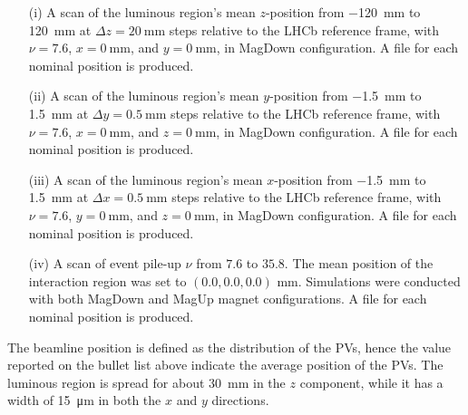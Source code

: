 \begin{enumerate}

    \item[(i)] A scan of the luminous region's mean $z$-position from \SI{-120}{\milli\meter} to \SI{120}{\milli\meter} at $\Delta z=\SI{20}{\milli\meter}$ steps relative to the LHCb reference frame, with $\nu = 7.6$, $x = \SI{0}{\milli\meter}$, and $y = \SI{0}{\milli\meter}$, in MagDown configuration. A file for each nominal position is produced.

    \item[(ii)] A scan of the luminous region's mean $y$-position from \SI{-1.5}{\milli\meter} to \SI{1.5}{\milli\meter} at $\Delta y =\SI{0.5}{\milli\meter}$ steps relative to the LHCb reference frame, with $\nu = 7.6$, $x = \SI{0}{\milli\meter}$, and $z = \SI{0}{\milli\meter}$, in MagDown configuration. A file for each nominal position is produced.

     \item[(iii)] A scan of the luminous region's mean $x$-position from \SI{-1.5}{\milli\meter} to \SI{1.5}{\milli\meter} at $\Delta x =\SI{0.5}{\milli\meter}$ steps relative to the LHCb reference frame, with $\nu = 7.6$, $y = \SI{0}{\milli\meter}$, and $z = \SI{0}{\milli\meter}$, in MagDown configuration. A file for each nominal position is produced.

     \item[(iv)] A scan of event pile-up \(\nu\) from $7.6$ to $35.8$. The mean position of the interaction region was set to $(0.0, 0.0, 0.0)$ mm. Simulations were conducted with both MagDown and MagUp magnet configurations. A file for each nominal position is produced.

\end{enumerate}


The beamline position is defined as the distribution of the PVs, hence the value reported on the bullet list above indicate the average position of the PVs. The luminous region is spread for about \SI{30}{\milli\meter} in the $z$ component, while it has a width of \SI{15}{\micro\meter} in both the $x$ and $y$ directions.  

